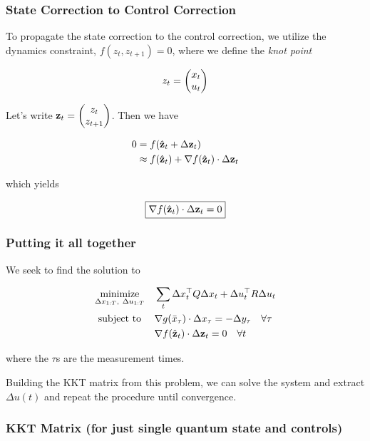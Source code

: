 \documentclass{article}
\begin{document}
\newpage
\subsubsection*{State Correction to Control Correction}

To propagate the state correction to the control correction, we utilize the dynamics constraint, $f(z_t, z_{t+1}) = 0$, where we define the \textit{knot point} 

$$
z_t =\mqty(x_t \\ u_t)
$$


Let's write $\vb{z}_t = \mqty(z_t \\ z_{t+1})$. Then we have

\begin{align*}
0 &= f( \hat{\vb{z}}_t + \Delta {\vb{z}}_t) \\
&\approx f(\hat{\vb{z}}_t) + \nabla f(\hat{\vb{z}}_t) \cdot \Delta {\vb{z}}_t \\
\end{align*}


which yields

\begin{equation}
  \boxed{
  \nabla f(\hat{\vb{z}}_t) \cdot \Delta {\vb{z}}_t = 0
  }
\end{equation}


\subsubsection*{Putting it all together}

We seek to find the solution to

\begin{align*}
  \underset{\Delta x_{1:T},\ \Delta u_{1:T}}{\text{minimize}} & \quad \sum_t \Delta x^\top_t Q \Delta x_t + \Delta u^\top_t R \Delta u_t \\
  \text{subject to} \ & \quad \nabla g(\bar x_\tau) \cdot \Delta x_\tau = - \Delta y_\tau \quad \forall \tau \\
  & \quad \nabla f(\hat{\vb{z}}_t) \cdot \Delta {\vb{z}}_t = 0 \quad \forall t
\end{align*}


where the $\tau$s are the measurement times.

\hfill


Building the KKT matrix from this problem, we can solve the system and extract $\Delta u(t)$ and repeat the procedure until convergence.

\newpage
\subsubsection*{KKT Matrix (for just single quantum state and controls)}
\end{document}
